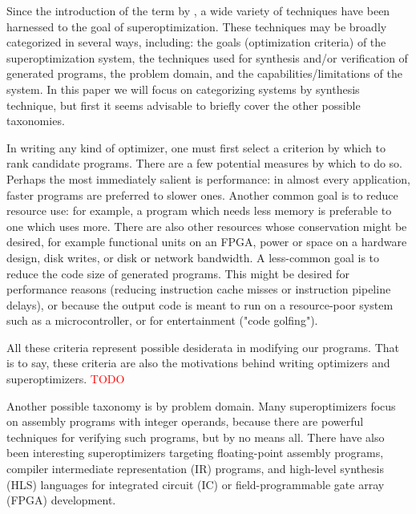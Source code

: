 \documentclass[12pt,twoside]{reedthesis}
\newcommand{\red}[1]{\textcolor{red}{#1}}
\begin{document}

Since the introduction of the term by \cite{massalin1987superoptimizer}, a wide variety of techniques have been harnessed to the goal of superoptimization.
These techniques may be broadly categorized in several ways, including:
    the goals (optimization criteria) of the superoptimization system,
    the techniques used for synthesis and/or verification of generated programs,
    the problem domain,
    and the capabilities/limitations of the system.
In this paper we will focus on categorizing systems by synthesis technique, but first it seems advisable to briefly cover the other possible taxonomies.

In writing any kind of optimizer, one must first select a criterion by which to rank candidate programs.
There are a few potential measures by which to do so.
Perhaps the most immediately salient is performance: 
    in almost every application, faster programs are preferred to slower ones.
Another common goal is to reduce resource use: 
    for example, a program which needs less memory is preferable to one which uses more.
There are also other resources whose conservation might be desired, for example 
    functional units on an FPGA, 
    power or space on a hardware design, 
    disk writes, 
    or disk or network bandwidth.
A less-common goal is to reduce the code size of generated programs.
    This might be desired for 
        performance reasons (reducing instruction cache misses or instruction pipeline delays), 
        or because the output code is meant to run on a resource-poor system such as a microcontroller, 
        or for entertainment ("code golfing").

All these criteria represent possible desiderata in modifying our programs.
That is to say, these criteria are also the motivations behind writing optimizers and superoptimizers. 
\red{TODO} %

Another possible taxonomy is by problem domain.
Many superoptimizers focus on assembly programs with integer operands, because there are powerful techniques for verifying such programs, but by no means all.
There have also been interesting superoptimizers targeting 
    floating-point assembly programs, 
    compiler intermediate representation (IR) programs, 
    and high-level synthesis (HLS) languages for integrated circuit (IC) or field-programmable gate array (FPGA) development.
\end{document}

